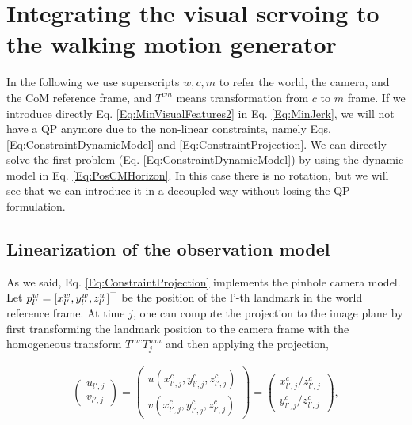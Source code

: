 \section{Integrating the visual servoing to the walking motion generator}
\label{sec:integration}
In the following we use superscripts $w,c,m$ to refer the world, the camera, and the CoM reference frame, and $T^{cm}$ means transformation from $c$ to $m$ frame. If we introduce directly Eq. \ref{Eq:MinVisualFeatures2} in Eq. \ref{Eq:MinJerk}, we will not have a QP anymore due to the non-linear constraints, namely Eqs. \ref{Eq:ConstraintDynamicModel} and \ref{Eq:ConstraintProjection}. We can directly solve the first problem (Eq. \ref{Eq:ConstraintDynamicModel}) by using the dynamic model in Eq. \ref{Eq:PosCMHorizon}. In this case there is no rotation, but we will see that we can introduce it in a decoupled way without losing the QP formulation.

\subsection{Linearization of the observation model}

As we said, Eq. \ref{Eq:ConstraintProjection} implements the pinhole camera model. Let $p^{w}_{l'} = [x^{w}_{l'},y^{w}_{l'},z^{w}_{l'}]^{\top}$ be the position of the {l'}-th landmark in the world reference frame. At time $j$, one can compute the projection to the image plane by first transforming the landmark position to the camera frame with the homogeneous transform $T^{mc} T^{wm}_j$ and then applying the projection,

\begin{equation}
\label{Eq:Projection}
\begin{array}{c}
 \left(
 \begin{matrix}
  u_{l',j} \\
  v_{l',j}
\end{matrix}
\right)
  =
 \left(
 \begin{matrix}
  u(x^{c}_{l',j},y^{c}_{l',j},z^{c}_{l',j}) \\
  v(x^{c}_{l',j},y^{c}_{l',j},z^{c}_{l',j})
 \end{matrix}
 \right)
 =  \left(
 \begin{matrix}
  x^{c}_{l',j} / z^{c}_{l',j}\\
  y^{c}_{l',j} / z^{c}_{l',j}
 \end{matrix}
 \right),
 \end{array}
\end{equation}

